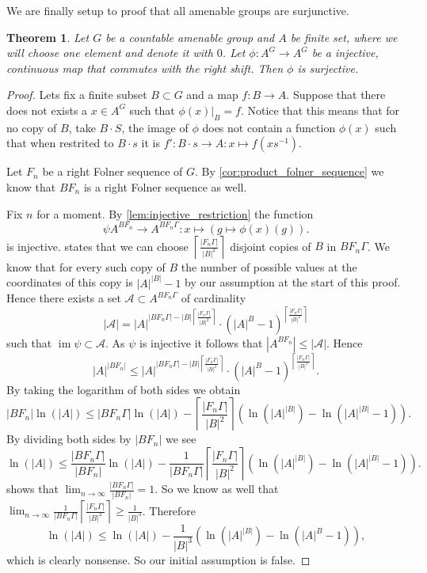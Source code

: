 \documentclass[titlepage, a4paper]{article}
\newcommand{\card}[1]{\left| #1 \right|}
\DeclareMathOperator{\im}{im}
\newtheorem{theorem}{Theorem}
\theoremstyle{remark}
\begin{document}
We are finally setup to proof that all amenable groups are surjunctive.
\begin{theorem}
	Let $G$ be a countable amenable group and  $A$ be finite set, where we will choose one element and denote it with $0$. Let  $\phi: A^{G} \to A^{G}$ be a injective, continuous map that commutes with the right shift. Then $\phi$ is surjective.
\end{theorem}

\begin{proof}
	Lets fix a finite subset $B \subset G$ and a map $f:B\to A$. 
	Suppose that there does not exists a  $x \in A^{G}$ such that $\phi(x)|_B = f$.
	Notice that this means that for no copy of $B$, take  $B\cdot S$, the image of $\phi$ does not contain a function  $\phi(x)$ such that when restrited to  $B\cdot s$ it is $f': B\cdot s \to A: x \mapsto f\left( x s^{-1} \right) $.

	Let $F_n$ be a right Folner sequence of $G$. By \cref{cor:product_folner_sequence} we know that $BF_n$ is a right Folner sequence as well. 

	Fix  $n$ for a moment. By \cref{lem:injective_restriction} the function \[
		\psi A^{BF_n} \to A^{BF_n\Gamma}: x \mapsto (g \mapsto \phi(x)(g))
	.\] 
	is injective.
	 states that we can choose  $ \left\lceil \frac{\card{F_n\Gamma}}{\card{B}^2} \right\rceil $ disjoint copies of $B$ in $BF_n\Gamma$. 
	We know that for every such copy of $B$ the number of possible values at the coordinates of this copy is  $\card{A}^{\card{B}} -1$ by our assumption at the start of this proof.
	Hence there exists a set $\mathcal{A} \subset A^{BF_n\Gamma}$ of cardinality \[
		\card{\mathcal{A}} = \card{A}^{\card{BF_n\Gamma}- \card{B}\left\lceil \frac{\card{F_n\Gamma}}{\card{B}^2} \right\rceil } \cdot (\card{A}^{B} -1)^{\left\lceil \frac{\card{F_n\Gamma}}{\card{B}^2} \right\rceil }
\]
such that $\im\psi \subset \mathcal{A}$. 
As $\psi$ is injective it follows that $\card{A^{BF_n}} \le \card{\mathcal{A}}$. Hence
\[
	\card{A}^{\card{BF_n}} \le 
	\card{A}^{\card{BF_n\Gamma}- \card{B}\left\lceil \frac{\card{F_n\Gamma}}{\card{B}^2} \right\rceil } \cdot (\card{A}^{B} -1)^{\left\lceil \frac{\card{F_n\Gamma}}{\card{B}^2} \right\rceil }
.\]
By taking the logarithm of both sides we obtain
\[
	\card{BF_n}\ln(\card{A}) \le \card{BF_n\Gamma} \ln(\card{A}) - \left\lceil \frac{\card{F_n\Gamma}}{\card{B}^2} \right\rceil \left( \ln(\card{A}^{\card{B}}) - \ln(\card{A}^{\card{B}} -1) \right)   
.\]
By dividing both sides by $\card{BF_n}$ we see 
\[
	\ln(\card{A}) \le \frac{\card{BF_n\Gamma}}{\card{BF_n}} \ln(\card{A}) - \frac{1}{\card{BF_n\Gamma}}\left\lceil \frac{\card{F_n\Gamma}}{\card{B}^2} \right\rceil \left( \ln(\card{A}^{\card{B}}) - \ln(\card{A}^{\card{B}} -1) \right)   
.\]
 shows that $\lim_{n \to \infty} \frac{\card{BF_n\Gamma}}{\card{BF_n}} = 1$. 
So we know as well that $\lim_{n \to \infty} \frac{1}{\card{BF_n\Gamma}} \left\lceil \frac{\card{F_n\Gamma}}{\card{B}^2} \right\rceil \ge \frac{1}{\card{B}^3} $. 
Therefore \[
	\ln(\card{A}) \le \ln(\card{A}) - \frac{1}{\card{B}^3} \left(\ln(\card{A}^{\card{B}}) - \ln(\card{A}^{B} - 1) \right)
,\]
which is clearly nonsense. 
So our initial assumption is false. 


\end{proof}
\end{document}
